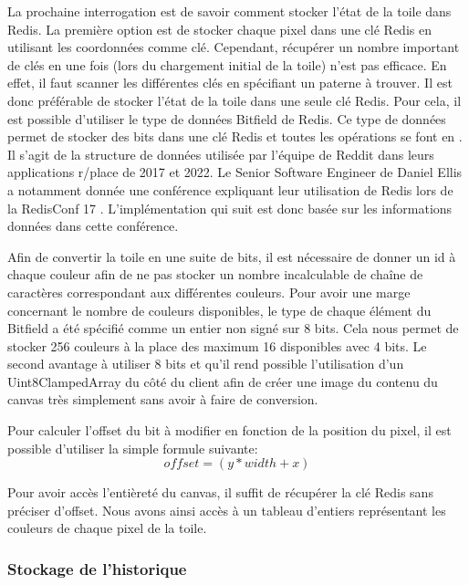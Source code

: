 La prochaine interrogation est de savoir comment stocker l'état de la toile dans Redis. La première option est de stocker chaque pixel dans une clé Redis en utilisant les coordonnées comme clé. Cependant, récupérer un nombre important de clés en une fois (lors du chargement initial de la toile) n'est pas efficace. En effet, il faut scanner les différentes clés en spécifiant un paterne à trouver. Il est donc préférable de stocker l'état de la toile dans une seule clé Redis. Pour cela, il est possible d'utiliser le type de données Bitfield \cite{bitfield} de Redis. Ce type de données permet de stocker des bits dans une clé Redis et toutes les opérations se font en . Il s'agit de la structure de données utilisée par l'équipe de Reddit dans leurs applications r/place de 2017 et 2022. Le Senior Software Engineer de Daniel Ellis a notamment donnée une conférence expliquant leur utilisation de Redis lors de la RedisConf 17 \cite{redisconf}. L'implémentation qui suit est donc basée sur les informations données dans cette conférence.

Afin de convertir la toile en une suite de bits, il est nécessaire de donner un id à chaque couleur afin de ne pas stocker un nombre incalculable de chaîne de caractères correspondant aux différentes couleurs. Pour avoir une marge concernant le nombre de couleurs disponibles, le type de chaque élément du Bitfield a été spécifié comme un entier non signé sur 8 bits. Cela nous permet de stocker 256 couleurs à la place des maximum 16 disponibles avec 4 bits. Le second avantage à utiliser 8 bits et qu'il rend possible l'utilisation d'un Uint8ClampedArray \cite{uint8clampedarray} du côté du client afin de créer une image du contenu du canvas très simplement sans avoir à faire de conversion.

Pour calculer l'offset du bit à modifier en fonction de la position du pixel, il est possible d'utiliser la simple formule suivante:
\begin{equation}
  offset = (y * width + x)
\end{equation}

Pour avoir accès l'entièreté du canvas, il suffit de récupérer la clé Redis sans préciser d'offset. Nous avons ainsi accès à un tableau d'entiers représentant les couleurs de chaque pixel de la toile.

\subsubsection{Stockage de l'historique}


